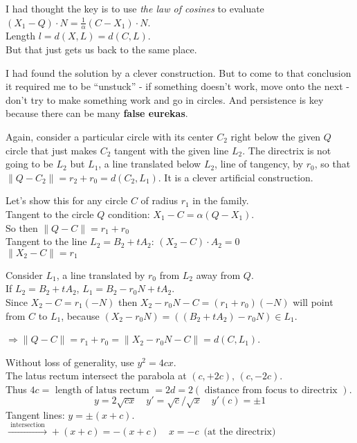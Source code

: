 \documentclass[twoside]{amsart}
\theoremstyle{plain}
\theoremstyle{definition}
\newcommand{\exercisehead}[1]
  {\smallskip
   \noindent{\small\bf Exercise #1.}}
\begin{document}
I had thought the key is to use \emph{ the law of cosines } to evaluate $(X_1 - Q)\cdot N = \frac{1}{\alpha} (C-X_1) \cdot N$.  \medskip \\
Length $l= d(X,L) = d(C,L)$. \medskip \\
But that just gets us back to the same place.  

I had found the solution by a clever construction.  But to come to that conclusion it required me to be ``unstuck'' - if something doesn't work, move onto the next - don't try to make something work and go in circles.  And persistence is key because there can be many \textbf{false eurekas}.  

Again, consider a particular circle with its center $C_2$ right below the given $Q$ circle that just makes $C_2$ tangent with the given line $L_2$.  The directrix is not going to be $L_2$ but $L_1$, a line translated below $L_2$, line of tangency, by $r_0$, so that $\| Q - C_2 \| = r_2 + r_0 = d(C_2,L_1)$.  It is a clever artificial construction.

Let's show this for any circle $C$ of radius $r_1$ in the family.  \medskip \\
Tangent to the circle $Q$ condition: $X_1 - C = \alpha(Q-X_1)$.  \medskip \\
So then $\| Q-C \| = r_1 + r_0$  \bigskip \\
Tangent to the line $L_2 = B_2 + tA_2$: $(X_2 - C) \cdot A_2 = 0$  \medskip \\
$\| X_2 - C \| = r_1$  

Consider $L_1$, a line translated by $r_0$ from $L_2$ away from $Q$.   \medskip \\
If $L_2 = B_2+tA_2$, \quad $L_1 = B_2 - r_0 N  + tA_2$.  \medskip \\
Since $X_2 - C = r_1 (-N)$ then $X_2 -r_0 N -C = (r_1 + r_0)(-N)$ will point from $C$ to $L_1$, because $(X_2 - r_0 N) = ((B_2 + t A_2 ) -r_0 N ) \in L_1$.  

$\Longrightarrow \| Q - C \| = r_1 + r_0 = \| X_2 - r_0 N - C \| = d(C,L_1)$.    


\exercisehead{23} Without loss of generality, use $y^2 = 4cx$.  \medskip \\
The latus rectum intersect the parabola at $(c,+2c), \, (c,-2c)$.  \bigskip \\
Thus $4c = \text{ length of latus rectum } = 2d = 2 ( \text{ distance from focus to directrix } )$.  
\[
y = 2 \sqrt{cx} \quad y' = \sqrt{c}/\sqrt{x} \quad y'(c) = \pm 1 
\]
Tangent lines: $y = \pm (x+c)$.  \medskip \\
$\xrightarrow{ \text{ intersection } } +(x+c) = -(x+c) \quad x = -c \, \text{ (at the directrix) } $  
\end{document}
